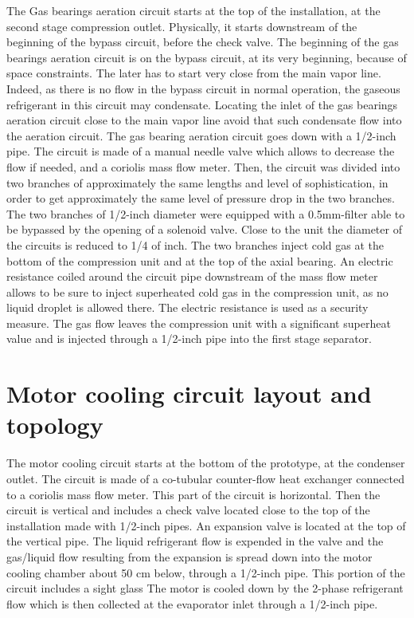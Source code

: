The Gas bearings aeration circuit starts at the top of the
installation, at the second stage compression outlet. Physically, it
starts downstream of the beginning of the bypass circuit, before the check
valve. The beginning of the gas bearings aeration circuit is on the
bypass circuit, at its very beginning, because of space
constraints. The later has to start very close from the main vapor
line. Indeed, as there is no flow in the bypass circuit in normal
operation, the gaseous refrigerant in this circuit may
condensate. Locating the inlet of the gas bearings aeration circuit
close to the main vapor line avoid that such condensate flow into the
aeration circuit. The gas bearing aeration circuit goes down with a
1/2-inch pipe. The circuit is made of a manual needle valve which
allows to decrease the flow if needed, and a coriolis mass flow
meter. Then, the circuit was divided into two branches of approximately
the same lengths and level of sophistication, in order to get
approximately the same level of pressure drop in the two branches. The
two branches of 1/2-inch diameter were equipped with a 0.5mm-filter
able to be bypassed by the opening of a solenoid valve. Close to the
unit the diameter of the circuits is reduced to 1/4 of inch. The two
branches inject cold gas at the bottom of the compression unit and at
the top of the axial bearing. An electric resistance coiled around the
circuit pipe downstream of the mass flow meter allows to be sure to inject
superheated cold gas in the compression unit, as no liquid droplet is
allowed there. The electric resistance is used as a security
measure. The gas flow leaves the compression unit with a significant
superheat value and is injected through a 1/2-inch pipe into the first
stage separator.

\section{Motor cooling circuit layout and topology}
\label{sec:bwp-motor-cooling-details}

The \BWP{} motor cooling circuit starts at the bottom of the
prototype, at the condenser outlet. The circuit is made of a
co-tubular counter-flow heat exchanger
connected to a coriolis mass flow meter. This part of the circuit is
horizontal. Then the circuit is vertical and includes a check valve
located close to the top of the installation made with 1/2-inch
pipes. An expansion valve is located at the top of the vertical
pipe. The liquid refrigerant flow is expended in the valve and the
gas/liquid flow resulting from the expansion is spread down into the
motor cooling chamber about 50 cm below, through a 1/2-inch pipe. This
portion of the circuit includes a sight glass The motor is cooled down
by the 2-phase refrigerant flow which is then collected at the
evaporator inlet through a 1/2-inch pipe.


